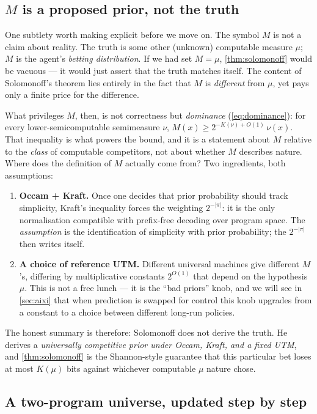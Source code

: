 \documentclass[12pt,a4paper]{article}
\theoremstyle{plain}
\theoremstyle{definition}
\begin{document}
\subsection*{$M$ is a proposed prior, not the truth}

One subtlety worth making explicit before we move on.  The symbol $M$
is not a claim about reality.  The truth is some other (unknown)
computable measure $\mu$; $M$ is the agent's \emph{betting
distribution}.  If we had set $M = \mu$, \cref{thm:solomonoff} would
be vacuous --- it would just assert that the truth matches itself.
The content of Solomonoff's theorem lies entirely in the fact that
$M$ is \emph{different} from $\mu$, yet pays only a finite price for
the difference.

What privileges $M$, then, is not correctness but \emph{dominance}
(\eqref{eq:dominance}): for every lower-semicomputable semimeasure
$\nu$, $M(x) \ge 2^{-K(\nu)+O(1)}\,\nu(x)$.  That inequality is what
powers the bound, and it is a statement about $M$ relative to the
\emph{class} of computable competitors, not about whether $M$
describes nature.  Where does the definition of $M$ actually come
from?  Two ingredients, both assumptions:
\begin{enumerate}
  \item \textbf{Occam + Kraft.}  Once one decides that prior
    probability should track simplicity, Kraft's inequality forces
    the weighting $2^{-|\pi|}$: it is the only normalisation
    compatible with prefix-free decoding over program space.  The
    \emph{assumption} is the identification of simplicity with prior
    probability; the $2^{-|\pi|}$ then writes itself.
  \item \textbf{A choice of reference UTM.}  Different universal
    machines give different $M$'s, differing by multiplicative
    constants $2^{O(1)}$ that depend on the hypothesis $\mu$.  This
    is not a free lunch --- it is the ``bad priors'' knob, and we
    will see in \cref{sec:aixi} that when prediction is swapped for
    control this knob upgrades from a constant to a choice between
    different long-run policies.
\end{enumerate}
The honest summary is therefore: Solomonoff does not derive the
truth.  He derives a \emph{universally competitive prior under Occam,
Kraft, and a fixed UTM}, and \cref{thm:solomonoff} is the
Shannon-style guarantee that this particular bet loses at most
$K(\mu)$ bits against whichever computable $\mu$ nature chose.

\subsection*{A two-program universe, updated step by step}
\end{document}
